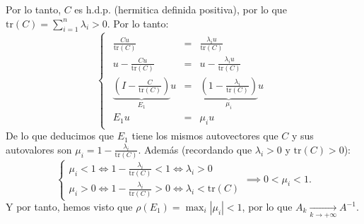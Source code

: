 {\begin{enumerate}[label=\alph*)]
\[        \]
        Por lo tanto, $C$ es h.d.p. (hermitica definida positiva), por lo que $\mathrm{tr}(C) = \sum_{i=1}^n \lambda_i > 0$. Por lo tanto:
        \[
            \begin{cases}
                \begin{array}{ccc}
                    \frac{Cu}{\mathrm{tr}(C)} & = & \frac{\lambda_i u}{\mathrm{tr}(C)} \\
                    u - \frac{Cu}{\mathrm{tr}(C)} & = & u - \frac{\lambda_i u}{\mathrm{tr}(C)} \\
                    \underbrace{\left( I - \frac{C}{\mathrm{tr}(C)} \right)}_{E_1} u 
                    & = & 
                    \underbrace{\left( 1 - \frac{\lambda_i}{\mathrm{tr}(C)} \right)}_{\mu_i} u \\
                    E_1 u & = & \mu_i u
                \end{array}
            \end{cases}
        \]
        De lo que deducimos que $E_1$ tiene los mismos autovectores que $C$ y sus autovalores son $\mu_i = 1 - \frac{\lambda_i}{\mathrm{tr}(C)}$. Además (recordando que $\lambda_i > 0$ y $\mathrm{tr}(C) > 0$):
        \[
            \begin{cases}
                \mu_i < 1 \iff 1 - \frac{\lambda_i}{\mathrm{tr}(C)} < 1 \iff \lambda_i > 0 \\
                \mu_i > 0 \iff 1 - \frac{\lambda_i}{\mathrm{tr}(C)} > 0 \iff \lambda_i < \mathrm{tr}(C)
            \end{cases}
            \implies
            0 < \mu_i < 1.
        \]
        Y por tanto, hemos visto que $\rho(E_1) = \max_{i} |\mu_i| < 1$, por lo que $A_k \xrightarrow[k \to +\infty]{} A^{-1}$.
    \end{enumerate}

}